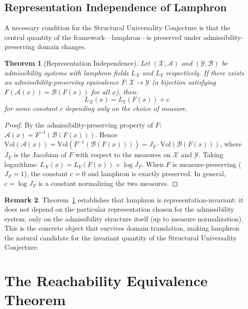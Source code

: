 \documentclass[12pt, oneside]{book}
\theoremstyle{flyxion}
\newtheorem{theorem}{Theorem}[chapter]
\theoremstyle{definition}
\newtheorem{remark}[theorem]{Remark}
\begin{document}
\section{Representation Independence of Lamphron}

A necessary condition for the Structural Universality
Conjecture is that the central quantity of the
framework---lamphron---is preserved under admissibility-
preserving domain changes.

\begin{theorem}[Representation Independence]
\label{thm:rep_independence}
Let $(\mathcal{X}, \mathcal{A})$ and $(\mathcal{Y},
\mathcal{B})$ be admissibility systems with lamphron
fields $L_X$ and $L_Y$ respectively. If there exists
an admissibility-preserving equivalence
$F : \mathcal{X} \to \mathcal{Y}$ (a bijection
satisfying $F(\mathcal{A}(x)) = \mathcal{B}(F(x))$
for all $x$), then:
\[
L_X(x) = L_Y(F(x)) + c
\]
for some constant $c$ depending only on the choice
of measure.
\end{theorem}

\begin{proof}
By the admissibility-preserving property of $F$:
$\mathcal{A}(x) = F^{-1}(\mathcal{B}(F(x)))$.
Hence $\mathrm{Vol}(\mathcal{A}(x)) =
\mathrm{Vol}(F^{-1}(\mathcal{B}(F(x)))) =
J_F \cdot \mathrm{Vol}(\mathcal{B}(F(x)))$,
where $J_F$ is the Jacobian of $F$ with respect to
the measures on $\mathcal{X}$ and $\mathcal{Y}$.
Taking logarithms: $L_X(x) = L_Y(F(x)) + \log J_F$.
When $F$ is measure-preserving ($J_F = 1$), the
constant $c = 0$ and lamphron is exactly preserved.
In general, $c = \log J_F$ is a constant normalizing
the two measures.
\end{proof}

\begin{remark}
Theorem~\ref{thm:rep_independence} establishes that
lamphron is representation-invariant: it does not
depend on the particular representation chosen for
the admissibility system, only on the admissibility
structure itself (up to measure normalization). This
is the concrete object that survives domain
translation, making lamphron the natural candidate
for the invariant quantity of the Structural
Universality Conjecture.
\end{remark}

\chapter{The Reachability Equivalence Theorem}
\end{document}
